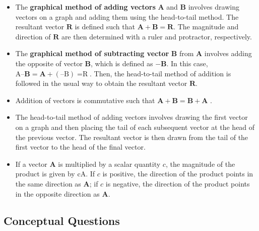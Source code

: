 \documentclass[
]{book}
\providecommand{\tightlist}{%
  \setlength{\itemsep}{0pt}\setlength{\parskip}{0pt}}
\begin{document}
\begin{itemize}
\tightlist
\item
  \protect\hypertarget{import-auto-id1165296253334}{}{The \textbf{graphical method of adding vectors} \(\mathbf{A}{}\) and
  \(\mathbf{B}{}\) involves drawing vectors on a graph and adding them
  using the head-to-tail method. The resultant vector \(\mathbf{R}{}\)
  is defined such that \({\textbf{A} + \textbf{B} = \textbf{R}}{}\). The
  magnitude and direction of \(\mathbf{R}{}\) are then determined with a
  ruler and protractor, respectively.}
\item
  \protect\hypertarget{import-auto-id1165298573640}{}{The \textbf{graphical method of subtracting vector} \(\mathbf{B}\) from
  \(\mathbf{A}{}\) involves adding the opposite of vector
  \(\mathbf{B}{}\), which is defined as \({- \mathbf{B}}{}\). In this
  case, \({\text{A}–\textbf{B} = \textbf{A} +}(\text{–B}){= \text{R}}\).
  Then, the head-to-tail method of addition is followed in the usual
  way to obtain the resultant vector
  \(\mathbf{R}\).}
\item
  \protect\hypertarget{import-auto-id1165296680072}{}{Addition of vectors is \protect\hypertarget{import-auto-id1165296680069}{}{commutative} such that
  \({\textbf{A} + \textbf{B} = \textbf{B} + \textbf{A}}{}\)
  .}
\item
  \protect\hypertarget{import-auto-id1165296269519}{}{The \protect\hypertarget{import-auto-id1165298982089}{}{head-to-tail method} of adding vectors involves drawing the first
  vector on a graph and then placing the tail of each subsequent
  vector at the head of the previous vector. The resultant vector is
  then drawn from the tail of the first vector to the head of the
  final vector.}
\item
  \protect\hypertarget{import-auto-id1165298819524}{}{If a vector \(\mathbf{A}{}\) is multiplied by a scalar quantity
  \(c{}\), the magnitude of the product is given by \(\text{cA}{}\). If
  \(c{}\) is positive, the direction of the product points in the same
  direction as \(\mathbf{A}{}\); if \(c{}\) is negative, the direction of
  the product points in the opposite direction as
  \(\mathbf{A}{}\).}
\end{itemize}

\hypertarget{fs-id1165299003649}{}
\hypertarget{conceptual-questions-7}{%
\subsection{Conceptual Questions}\label{conceptual-questions-7}}
\end{document}
